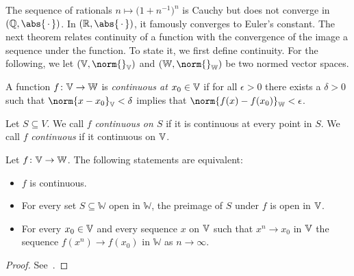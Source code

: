 The sequence of rationals \( n \mapsto \bigl( \num{1} + n^{\num{-1}} \bigr)^n \) is Cauchy but does not converge in \( (\mathbb{Q}, \abs{\argm}) \).
In \( (\R, \abs{\argm}) \), it famously converges to Euler's constant.
The next theorem relates continuity of a function with the convergence of the image a sequence under the function.
To state it, we first define continuity.
For the following, we let \( (\V, \norm{}_{\V}) \) and \( (\mathbb{W}, \norm{}_{\mathbb{W}}) \) be two normed vector spaces.
\begin{definition}[Continuity]%
	\label{def:continuity}
	A function \( f \colon \mathbb{V} \to \mathbb{W} \) is \emph{continuous at \( x_{\num{0}} \in \mathbb{V} \)} if for all \( \epsilon > \num{0} \) there exists a \( \delta > \num{0} \) such that \( \norm{x - x_{\num{0}}}_{\V} < \delta \) implies that \( \norm{f(x) - f(x_{\num{0}})}_{\mathbb{W}} < \epsilon \).
\end{definition}
Let \( S \subseteq V \).
We call \( f \) \emph{continuous on \( S \)} if it is continuous at every point in \( S \).
We call \( f \) \emph{continuous} if it continuous on \( \mathbb{V} \).
\begin{theorem}
	Let \( f \colon \mathbb{V} \to \mathbb{W} \).
	The following statements are equivalent:
	\begin{itemize}
		\item \( f \) is continuous.
		\item For every set \( S \subseteq \mathbb{W} \) open in \( \mathbb{W} \), the preimage of \( S \) under \( f \) is open in \( \mathbb{V} \).
		\item For every \( x_{\num{0}} \in \mathbb{V} \) and every sequence \( x \) on \( \mathbb{V} \) such that \( x^n \to x_{\num{0}} \) in \( \mathbb{V} \) the sequence \( f(x^n) \to f(x_{\num{0}}) \) in \( \mathbb{W} \) as \( n \to \infty \).
	\end{itemize}
\end{theorem}
\begin{proof}
	See~\cite[section 2.17]{Alt2016}.
\end{proof}

